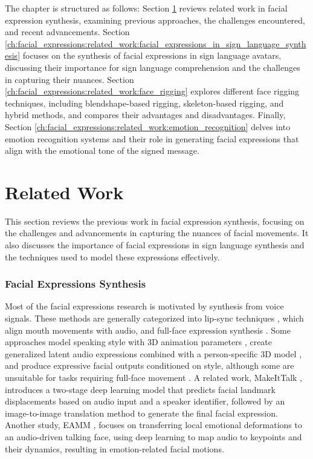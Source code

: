 \documentclass[../../main.tex]{subfiles}
\begin{document}
The chapter is structured as follows: Section \ref{ch:facial_expressions:related_work} reviews related work in facial expression synthesis, examining previous approaches, the challenges encountered, and recent advancements. Section \ref{ch:facial_expressions:related_work:facial_expressions_in_sign_language_synthesis} focuses on the synthesis of facial expressions in sign language avatars, discussing their importance for sign language comprehension and the challenges in capturing their nuances. Section \ref{ch:facial_expressions:related_work:face_rigging} explores different face rigging techniques, including blendshape-based rigging, skeleton-based rigging, and hybrid methods, and compares their advantages and disadvantages. Finally, Section \ref{ch:facial_expressions:related_work:emotion_recognition} delves into emotion recognition systems and their role in generating facial expressions that align with the emotional tone of the signed message.

\section{Related Work}
\label{ch:facial_expressions:related_work}

This section reviews the previous work in facial expression synthesis, focusing on the challenges and advancements in capturing the nuances of facial movements. It also discusses the importance of facial expressions in sign language synthesis and the techniques used to model these expressions effectively.

\subsubsection{Facial Expressions Synthesis}
\label{ch:facial_expressions:related_work:facial_expressions_synthesis}

Most of the facial expressions research is motivated by synthesis from voice signals. These methods are generally categorized into lip-sync techniques \cite{yousaidthat, talkingface, lipmovements, lipsyncexpert}, which align mouth movements with audio, and full-face expression synthesis \cite{eskimez, greenwood18, controllable_facial_synth}. Some approaches model speaking style with 3D animation parameters \cite{cudeiro}, create generalized latent audio expressions combined with a person-specific 3D model \cite{FLAME}, and produce expressive facial outputs conditioned on style, although some are unsuitable for tasks requiring full-face movement \cite{imitating}. A related work, MakeItTalk \cite{Yang:2020:MakeItTalk}, introduces a two-stage deep learning model that predicts facial landmark displacements based on audio input and a speaker identifier, followed by an image-to-image translation method to generate the final facial expression. Another study, EAMM \cite{eamm}, focuses on transferring local emotional deformations to an audio-driven talking face, using deep learning to map audio to keypoints and their dynamics, resulting in emotion-related facial motions.
\end{document}
